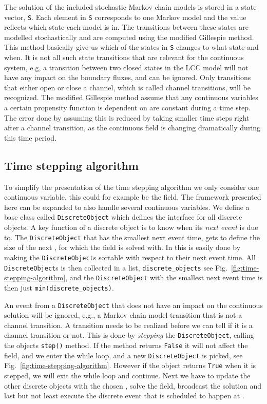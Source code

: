 The solution of the included stochastic Markov chain models is stored in a state vector, \texttt{S}. Each element in \texttt{S} corresponds to one Markov model and the value reflects which state each model is in. The transitions between these states are modelled stochastically and are computed using the modified Gillespie method. This method basically give us which of the states in \texttt{S} changes to what state and when. It is not all such state transitions that are relevant for the continuous system, e.g, a transition between two closed states in the LCC model will not have any impact on the boundary fluxes, and can be ignored. Only transitions that either open or close a channel, which is called channel transitions, will be recognized. The modified Gillespie method assume that any continuous variables a certain propensity function is dependent on are constant during a time step. The error done by assuming this is reduced by taking smaller time steps right after a channel transition, as the continuous field is changing dramatically during this time period. \par

\subsection{Time stepping algorithm}
\label{sec:event-driven-simulator}
To simplify the presentation of the time stepping algorithm we only consider one continuous variable, this could for example be the \Ca field. The framework presented here can be expanded to also handle several continuous variables. We define a base class called \texttt{DiscreteObject} which defines the interface for all discrete objects. A key function of a discrete object is to know when its \textit{next event} is due to. The \texttt{DiscreteObject} that has the smallest next event time, gets to define the size of the next \Dt, for which the \Ca field is solved with. In \python this is easily done by making the \texttt{DiscreteObject}s sortable with respect to their next event time. All \texttt{DiscreteObject}s is then collected in a list, \texttt{discrete\_objects} see Fig.~\ref{fig:time-stepping-algorithm}, and the \texttt{DiscreteObject} with the smallest next event time is then just \texttt{min(discrete\_objects)}.\par

An event from a \texttt{DiscreteObject} that does not have an impact on the continuous solution will be ignored, e.g., a Markov chain model transition that is not a channel transition. A transition needs to be realized before we can tell if it is a channel transition or not. This is done by \textit{stepping} the \texttt{DiscreteObject}, calling the objects \texttt{step()} method. If the method returns \texttt{False} it will not affect the \Ca field, and we enter the while loop, and a new \texttt{DiscreteObject} is picked, see Fig.~\ref{fig:time-stepping-algorithm}. However if the object returns \texttt{True} when it is stepped, we will exit the while loop and continue. Next we have to update the other discrete objects with the chosen \Dt, solve the \Ca field, broadcast the solution and last but not least execute the discrete event that is scheduled to happen at \Dt.\par

